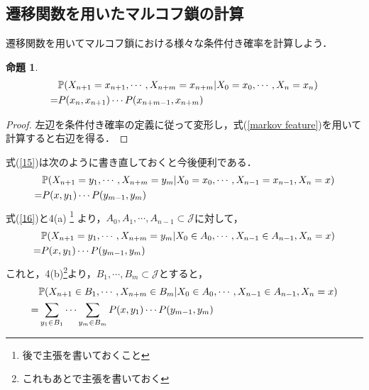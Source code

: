 \documentclass[12pt, a4paper]{jsarticle}
\theoremstyle{definition}
\newtheorem{prop}[thm]{命題}
\begin{document}
\subsection{遷移関数を用いたマルコフ鎖の計算}
遷移関数を用いてマルコフ鎖における様々な条件付き確率を計算しよう．
\begin{screen}
\begin{prop}
\begin{align}
&\mathbb{P}(X_{n+1} = x_{n+1}, \cdots,X_{n+m}=x_{n+m} | X_0 = x_0 ,\cdots, X_n = x_n) \notag \\
 = &P(x_n,x_{n+1})\cdots P(x_{n+m-1} ,x_{n+m}) \label{15} 
\end{align}
\end{prop}
\end{screen}
\begin{proof}
左辺を条件付き確率の定義に従って変形し，式(\ref{markov feature})を用いて計算すると右辺を得る．
\end{proof}
式(\ref{15})は次のように書き直しておくと今後便利である．
\begin{align}
&\mathbb{P}(X_{n+1} = y_{1}, \cdots,X_{n+m}=y_{m} | X_0 = x_0 ,\cdots,X_{n-1}= x_{n-1}, X_n = x) \notag \\
 = & P(x,y_{1})\cdots P(y_{m-1} ,y_{m}) \label{16}
\end{align}
式(\ref{16})と4(a) \footnote{後で主張を書いておくこと} より，$A_0,A_1,\cdots,A_{n-1} \subset \mathcal{J}$に対して，
\begin{align}
&\mathbb{P}(X_{n+1} = y_{1}, \cdots,X_{n+m}=y_{m} | X_0 \in A_0 ,\cdots,X_{n-1} \in A_{n-1}, X_n = x) \notag \\
 = & P(x,y_{1})\cdots P(y_{m-1} ,y_{m}) \label{17}
\end{align}
これと，4(b)\footnote{これもあとで主張を書いておく}より，$B_1,\cdots,B_{m} \subset \mathcal{J}$とすると，
\begin{align}
&\mathbb{P}(X_{n+1} \in B_1, \cdots,X_{n+m} \in B_m | X_0 \in A_0 ,\cdots,X_{n-1} \in A_{n-1}, X_n = x) \notag \\
 = &\sum_{y_1 \in B_1} \cdots \sum_{y_m \in B_m} P(x,y_{1})\cdots P(y_{m-1} ,y_{m}) \label{18}
\end{align}
\end{document}
